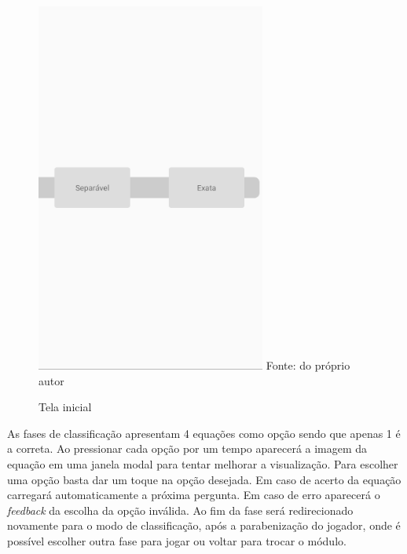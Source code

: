 \begin{figure}[H]
\centering
\caption{Tela inicial}
\includegraphics[scale=0.72]{figuras/modo_classificacao_3.png}
\small{Fonte: do próprio autor}
\end{figure}

As fases de classificação apresentam 4 equações como opção sendo que apenas 1 é a correta.
Ao pressionar cada opção por um tempo aparecerá a imagem da equação em uma janela modal para tentar melhorar a visualização.
Para escolher uma opção basta dar um toque na opção desejada.
Em caso de acerto da equação carregará automaticamente a próxima pergunta.
Em caso de erro aparecerá o \textit{feedback} da escolha da opção inválida.
Ao fim da fase será redirecionado novamente para o modo de classificação, após a parabenização do jogador, onde é possível escolher outra fase para jogar ou voltar para trocar o módulo.

